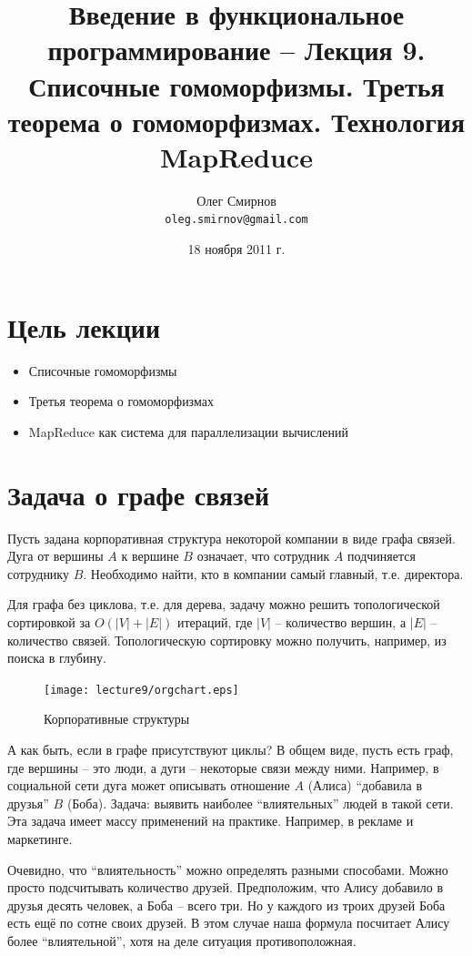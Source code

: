 \documentclass[a4paper,11pt]{article}
\author{Олег Смирнов\\
\texttt{oleg.smirnov@gmail.com}}
\date{18 ноября 2011 г.}
\title{Введение в функциональное программирование -- Лекция 9. Списочные
гомоморфизмы. Третья теорема о гомоморфизмах. Технология MapReduce}
\begin{document}
\maketitle
\tableofcontents
\newpage

\section*{Цель лекции}
\begin{itemize}
\item Списочные гомоморфизмы
\item Третья теорема о гомоморфизмах
\item MapReduce как система для параллелизации вычислений
\end{itemize}

\section{Задача о графе связей}
Пусть задана корпоративная структура некоторой компании в виде графа связей.
Дуга от вершины $A$ к вершине $B$ означает, что сотрудник $A$ подчиняется 
сотруднику $B$. Необходимо найти, кто в компании самый главный, т.е. директора.

Для графа без циклова, т.е. для дерева, задачу можно решить топологической
сортировкой за $O(|V| + |E|)$ итераций, где $|V|$ -- количество вершин, а
$|E|$ -- количество связей. Топологическую сортировку можно получить, например,
из поиска в глубину.

\begin{figure}[h]
    \begin{center}
        \texttt{[image: lecture9/orgchart.eps]}
        \caption{Корпоративные структуры}
    \end{center}
\end{figure}

А как быть, если в графе присутствуют циклы? В общем виде, пусть есть граф,
где вершины -- это люди, а дуги -- некоторые связи между ними. Например,
в социальной сети дуга может описывать отношение $A$ (Алиса) ``добавила в 
друзья'' $B$ (Боба). Задача: выявить наиболее ``влиятельных'' людей в такой
сети. Эта задача имеет массу применений на практике. Например, в рекламе и
маркетинге.

Очевидно, что ``влиятельность'' можно определять разными способами. Можно просто
подсчитывать количество друзей. Предположим, что Алису добавило в друзья
десять человек, а Боба -- всего три. Но у каждого из троих друзей Боба есть
ещё по сотне своих друзей. В этом случае наша формула посчитает Алису более
``влиятельной'', хотя на деле ситуация противоположная.
\end{document}

